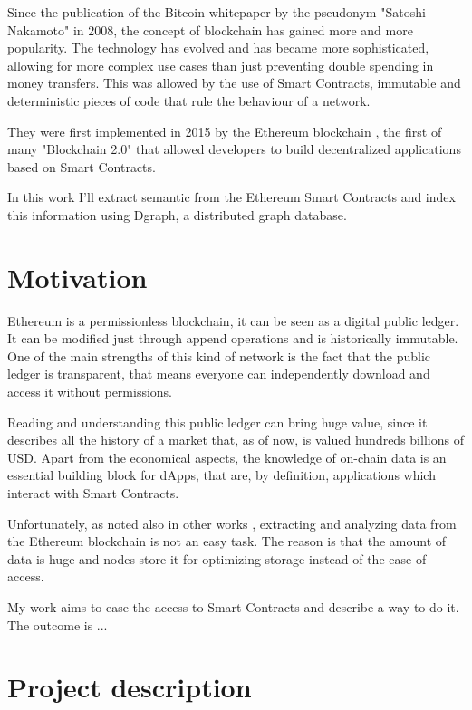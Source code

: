 
Since the publication of the Bitcoin \cite{bitcoin} whitepaper by the pseudonym "Satoshi Nakamoto" in 2008, the concept of blockchain has gained more and more popularity. The technology has evolved and has became more sophisticated, allowing for more complex use cases than just preventing double spending in money transfers. This was allowed by the use of Smart Contracts, immutable and deterministic pieces of code that rule the behaviour of a network.

\noindent They were first implemented in 2015 by the Ethereum blockchain \cite{Ethereum}, the first of many "Blockchain 2.0" that allowed developers to build decentralized applications based on Smart Contracts. 

\noindent In this work I'll extract semantic from the Ethereum Smart Contracts and index this information using Dgraph\cite{dgraph}, a distributed graph database.

\section{Motivation}

Ethereum is a permissionless blockchain, it can be seen as a digital public ledger. It can be modified just through append operations and is historically immutable. One of the main strengths of this kind of network is the fact that the public ledger is transparent, that means everyone can independently download and access it without permissions.

\noindent Reading and understanding this public ledger can bring huge value, since it describes all the history of a market that, as of now, is valued hundreds billions of USD. Apart from the economical aspects, the knowledge of on-chain data is an essential building block for dApps, that are, by definition, applications which interact with Smart Contracts.

\noindent Unfortunately, as noted also in other works \cite{dataether} \cite{xblock} \cite{ethereum_query_language}, extracting and analyzing data from the Ethereum blockchain is not an easy task. The reason is that the amount of data is huge and nodes store it for optimizing storage instead of the ease of access.

\noindent My work aims to ease the access to Smart Contracts and describe a way to do it. The outcome is ...


\section{Project description}

